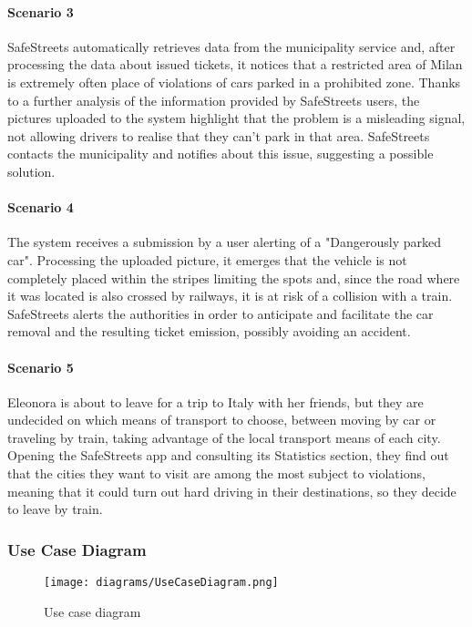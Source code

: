 \paragraph{Scenario 3}
\label{scenario:3}
	SafeStreets automatically retrieves data from the municipality service and, after processing the data about issued tickets, it notices that a restricted area of Milan is extremely often place of violations of cars parked in a prohibited zone. Thanks to a further analysis of the information provided by SafeStreets users, the pictures uploaded to the system highlight that the problem is a misleading signal, not allowing drivers to realise that they can't park in that area. SafeStreets contacts the municipality and notifies about this issue, suggesting a possible solution.

\paragraph{Scenario 4}
\label{scenario:4}
	The system receives a submission by a user alerting of a "Dangerously parked car". Processing the uploaded picture, it emerges that the vehicle is not completely placed within the stripes limiting the spots and, since the road where it was located is also crossed by railways, it is at risk of a collision with a train. SafeStreets alerts the authorities in order to anticipate and facilitate the car removal and the resulting ticket emission, possibly avoiding an accident.	
	
\paragraph{Scenario 5}
\label{scenario:5}
	Eleonora is about to leave for a trip to Italy with her friends, but they are undecided on which means of transport to choose, between moving by car or traveling by train, taking advantage of the local transport means of each city. Opening the SafeStreets app and consulting its Statistics section, they find out that the cities they want to visit are among the most subject to violations, meaning that it could turn out hard driving in their destinations, so they decide to leave by train.
	
\clearpage

\subsubsection{Use Case Diagram}
	\begin{figure}[h!]
		\centering
		\texttt{[image: diagrams/UseCaseDiagram.png]}
		\caption{
			\label{fig:useCase} 
				Use case diagram
		}
	\end{figure}
	
